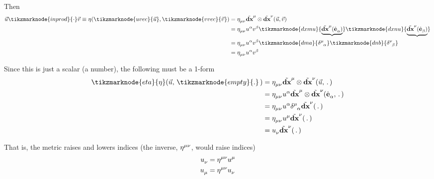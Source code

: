 \documentclass{article}
\begin{document}
Then
\begin{align*}
	\vec{u} \tikzmarknode{inprod}{\cdot} \vec{v} \equiv \eta ( \tikzmarknode{uvec}{\vec{u}}, \tikzmarknode{vvec}{\vec{v}} ) &= \tensor{\eta}{_\mu_\nu} \tensor{\tilde{\mathbf{dx}}}{^\mu} \otimes \tensor{\tilde{\mathbf{dx}}}{^\nu} ( \vec{u}, \vec{v} ) \\
	&= \tensor{\eta}{_\mu_\nu} \tensor{u}{^\alpha} \tensor{v}{^\beta} \tikzmarknode{dxmu}{\underbrace{\tensor{\tilde{\mathbf{dx}}}{^\mu} ( \tensor{\hat{\mathbf{e}}}{_\alpha} ) }} \tikzmarknode{dxnu}{\underbrace{\tensor{\tilde{\mathbf{dx}}}{^\nu} ( \tensor{\hat{\mathbf{e}}}{_\beta} ) }} \\
	&= \tensor{\eta}{_\mu_\nu} \tensor{u}{^\alpha} \tensor{v}{^\beta} \tikzmarknode{dma}{\tensor{\delta}{^\mu_\alpha}} \tikzmarknode{dnb}{\tensor{\delta}{^\nu_\beta}} \\
	&= \tensor{\eta}{_\mu_\nu} \tensor{u}{^\alpha} \tensor{v}{^\beta}
\end{align*}


\noindent Since this is just a scalar (a number), the following must be a 1-form
\begin{align*}
	\tikzmarknode{eta}{\eta} ( \vec{u}, \,\tikzmarknode{empty}{.}\, ) &= \tensor{\eta}{_\mu_\nu} \tensor{\tilde{\mathbf{dx}}}{^\mu} \otimes \tensor{\tilde{\mathbf{dx}}}{^\nu} ( \vec{u}, \,.\, ) \\
	&= \tensor{\eta}{_\mu_\nu} \tensor{u}{^\alpha} \tensor{\tilde{\mathbf{dx}}}{^\mu} \otimes \tensor{\tilde{\mathbf{dx}}}{^\nu} ( \tensor{\hat{\mathbf{e}}}{_\alpha}, \,.\, ) \\
	&= \tensor{\eta}{_\mu_\nu} \tensor{u}{^\alpha} \tensor{\delta}{^\mu_\alpha} \tensor{\tilde{\mathbf{dx}}}{^\nu} ( \,.\, ) \\
	&= \tensor{\eta}{_\mu_\nu} \tensor{u}{^\mu} \tensor{\tilde{\mathbf{dx}}}{^\nu} ( \,.\, ) \\
	&= \tensor{u}{_\nu} \tensor{\tilde{\mathbf{dx}}}{^\nu} ( \,.\, )
\end{align*}

\noindent That is, the metric raises and lowers indices (the inverse, $\tensor{\eta}{^\mu^\nu}$, would raise indices)
\begin{align*}
	\tensor{u}{_\nu} &= \tensor{\eta}{^\mu^\nu} \tensor{u}{^\mu} \\
	\tensor{u}{_\mu} &= \tensor{\eta}{^\mu^\nu} \tensor{u}{_\nu}	
\end{align*}
\end{document}
